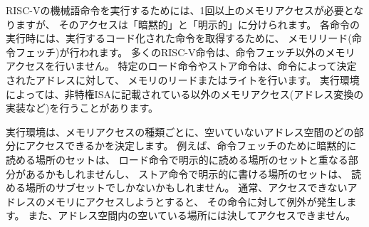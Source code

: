 \begin{comment}
Executing each RISC-V machine instruction entails one or more memory
accesses, subdivided into {\em
implicit} and {\em explicit} accesses.  For each instruction executed, an {\em
implicit} memory read (instruction fetch) is done to obtain the encoded
instruction to execute.  Many RISC-V instructions perform no further memory
accesses beyond instruction fetch.  Specific load and store instructions
perform an {\em explicit} read or write of memory at an address determined by
the instruction.  The execution environment may dictate that instruction
execution performs other {\em implicit} memory accesses (such as to implement
address translation) beyond those documented for the unprivileged ISA.
\end{comment}

RISC-Vの機械語命令を実行するためには、1回以上のメモリアクセスが必要となりますが、
そのアクセスは「暗黙的」と「明示的」に分けられます。
各命令の実行時には、実行するコード化された命令を取得するために、
メモリリード(命令フェッチ)が行われます。
多くのRISC-V命令は、命令フェッチ以外のメモリアクセスを行いません。
特定のロード命令やストア命令は、命令によって決定されたアドレスに対して、
メモリのリードまたはライトを行います。
実行環境によっては、非特権ISAに記載されている以外のメモリアクセス(アドレス変換の実装など)を行うことがあります。

\begin{comment}
The execution environment determines what portions of the
non-vacant address space are
accessible for each kind of memory access.  For example, the set of locations
that can be implicitly read for instruction fetch may or may not have any
overlap with the set of locations that can be explicitly read by a load
instruction; and the set of locations that can be explicitly written by
a store instruction may be only a subset of locations that can be read.
Ordinarily, if an instruction attempts to access memory at an inaccessible
address, an exception is raised for the instruction.
Vacant locations in the address space are never accessible.
\end{comment}

実行環境は、メモリアクセスの種類ごとに、空いていないアドレス空間のどの部分にアクセスできるかを決定します。
例えば、命令フェッチのために暗黙的に読める場所のセットは、
ロード命令で明示的に読める場所のセットと重なる部分があるかもしれませんし、
ストア命令で明示的に書ける場所のセットは、
読める場所のサブセットでしかないかもしれません。
通常、アクセスできないアドレスのメモリにアクセスしようとすると、
その命令に対して例外が発生します。
また、アドレス空間内の空いている場所には決してアクセスできません。

